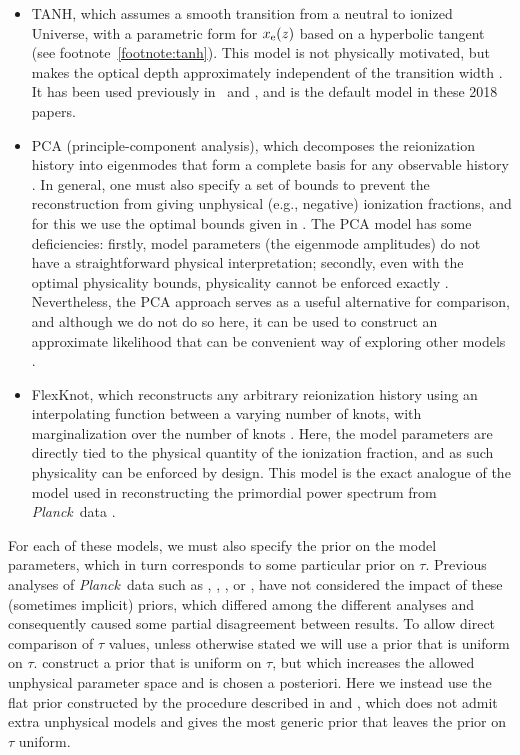 \documentclass[longauth,traditabstract]{aa}
\def\Planck{\textit{Planck}}
\newcommand{\paramsI}{\citetalias{planck2013-p11}}
\newcommand{\paramsII}{\citetalias{planck2014-a15}}
\begin{document}
\begin{itemize}
    \item TANH, which assumes a smooth transition from a neutral to ionized
    Universe, with a parametric form for $x_{\rm e}(z)$ based on a hyperbolic
    tangent (see footnote~\ref{footnote:tanh}). This model is not physically motivated, but makes the optical depth
    approximately independent of the transition width \citep{Lewis:2008wr}. It
    has been used previously in \paramsI\ and \paramsII, and is the default
    model in these 2018 papers.
    \item PCA (principle-component analysis), which decomposes the reionization history into eigenmodes that
    form a complete basis for any observable history \citep{hu2003}. In general,
    one must also specify a set of bounds to prevent the
    reconstruction from giving unphysical (e.g., negative) ionization fractions,
    and for this we use the optimal bounds given in \cite{Millea:2018bko}. The PCA model
    has some deficiencies: firstly, model parameters (the eigenmode
    amplitudes) do not have a straightforward  physical interpretation;
    secondly,
    even with the optimal physicality bounds, physicality cannot be
    enforced exactly \citep{mortonson2008,Millea:2018bko}. Nevertheless, the PCA
    approach serves as a useful alternative for comparison, and although we do not do so here, it can be
    used to construct an approximate likelihood that can be convenient way of
    exploring other models \citep{Heinrich:2018btc,miranda2017}.
    \item FlexKnot, which reconstructs any arbitrary reionization history using
    an interpolating function between a varying number of knots, with marginalization over the number
    of knots  \citep{Millea:2018bko}. Here,
    the model parameters are directly tied to the physical quantity of the
    ionization fraction, and as such physicality can be enforced by design. This
    model is the exact analogue of the  model used in reconstructing the
    primordial power spectrum from \Planck\ data
    \citep{vazquez2012,planck2014-a24}.
\end{itemize}

For each of these models, we must also specify the prior on the model
parameters, which in turn corresponds to some particular prior on $\tau$.
Previous analyses of \Planck\ data such as \cite{heinrich2017},
\cite{Obied:2018qdr}, \cite{hazra2017}, or \cite{Villanueva-Domingo:2017ahx},
have not considered the impact of these (sometimes implicit) priors, which
differed among the different analyses and consequently caused some partial
disagreement between results.
To allow direct comparison of $\tau$ values, unless otherwise stated we will use a prior that is
uniform on $\tau$. \cite{Heinrich:2018btc} construct a prior that is uniform on
$\tau$, but which increases the allowed unphysical parameter space and is chosen
a posteriori. Here we instead use the flat prior constructed by the procedure
described in \citet{Millea:2018bko} and \citet{Handley:2018gel}, which does not
admit extra unphysical models and gives the most generic prior that leaves the
prior on $\tau$ uniform.
\end{document}
